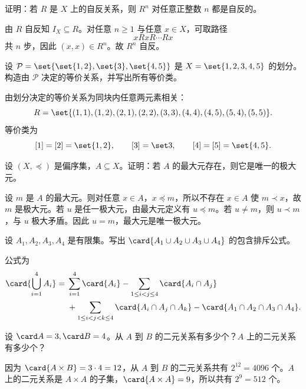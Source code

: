 \begin{exercise}[level=advanced]
证明：若 $R$ 是 $X$ 上的自反关系，则 $R^n$ 对任意正整数 $n$ 都是自反的。
\begin{solution}
由 $R$ 自反知 $I_X\subseteq R$。对任意 $n\ge1$ 与任意 $x\in X$，可取路径
  \[
  xRxR\cdots Rx
  \]
  共 $n$ 步，因此 $(x,x)\in R^n$。故 $R^n$ 自反。
\end{solution}
\end{exercise}

\begin{exercise}[level=advanced]
设 $\mathcal P=\set{\set{1,2},\set{3},\set{4,5}}$ 是 $X=\set{1,2,3,4,5}$ 的划分。构造由 $\mathcal P$ 决定的等价关系，并写出所有等价类。
\begin{solution}
由划分决定的等价关系为同块内任意两元素相关：
  \[
  R=\set{(1,1),(1,2),(2,1),(2,2),(3,3),(4,4),(4,5),(5,4),(5,5)}.
  \]
  等价类为
  \[
  [1]=[2]=\set{1,2},\qquad [3]=\set3,\qquad [4]=[5]=\set{4,5}.
  \]
\end{solution}
\end{exercise}

\begin{exercise}[level=advanced]
设 $(X,\preceq)$ 是偏序集，$A\subseteq X$。证明：若 $A$ 的最大元存在，则它是唯一的极大元。
\begin{solution}
设 $m$ 是 $A$ 的最大元。则对任意 $x\in A$，$x\preceq m$，所以不存在 $x\in A$ 使 $m\prec x$，故 $m$ 是极大元。若 $u$ 是任一极大元，由最大元定义有 $u\preceq m$。若 $u\ne m$，则 $u\prec m$，与 $u$ 极大矛盾。因此 $u=m$，最大元是唯一极大元。
\end{solution}
\end{exercise}

\begin{exercise}[level=advanced]
设 $A_1,A_2,A_3,A_4$ 是有限集。写出 $\card{A_1\cup A_2\cup A_3\cup A_4}$ 的包含排斥公式。
\begin{solution}
公式为
  \[
  \begin{aligned}
  \card{\bigcup_{i=1}^4 A_i}
  ={}&\sum_{i=1}^4\card{A_i}
  -\sum_{1\le i<j\le4}\card{A_i\cap A_j}\\
  &+\sum_{1\le i<j<k\le4}\card{A_i\cap A_j\cap A_k}
  -\card{A_1\cap A_2\cap A_3\cap A_4}.
  \end{aligned}
  \]
\end{solution}
\end{exercise}

\begin{exercise}[level=advanced]
设 $\card A=3,\card B=4$。从 $A$ 到 $B$ 的二元关系有多少个？$A$ 上的二元关系有多少个？
\begin{solution}
因为 $\card{A\times B}=3\cdot4=12$，从 $A$ 到 $B$ 的二元关系共有 $2^{12}=4096$ 个。$A$ 上的二元关系是 $A\times A$ 的子集，$\card{A\times A}=9$，所以共有 $2^9=512$ 个。
\end{solution}
\end{exercise}

